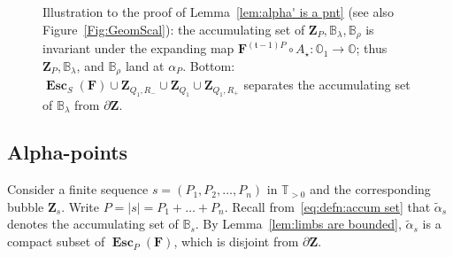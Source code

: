 \documentclass{amsart}
\newcommand{\1}{{\mathbb 1 }}
\newcommand\PT{\mathbb{ T}}
\newcommand{\bB}{{\mathbb{B}}}
\newcommand{\bO}{{\mathbb{O}}}
\newcommand{\bF}{{\mathbf F}}
\newcommand{\bZ}{{\mathbf Z}}
\newcommand{\str}{{\star}}
\renewcommand{\tt}{\mathfrak{t}}
\theoremstyle{remark}
\numberwithin{equation}{section}
\theoremstyle{definition}
\newcommand{\Esc}{{\boldsymbol{\operatorname{Esc}}}}
\theoremstyle{nonumberbreak}
\begin{document}
\begin{figure}[tp!]
 \caption{Illustration to the proof of Lemma~\ref{lem:alpha' is a pnt} (see also Figure~\ref{Fig:GeomScal}): the accumulating set of $\bZ_P, \bB_{\lambda}, \bB_{\rho}$ is invariant under the expanding map $\bF^{(\tt-1)P}\circ A_\str \colon \bO_1\to \bO$; thus $\bZ_P, \bB_{\lambda}$, and $\bB_{\rho}$  land at $\alpha_P$. Bottom: $\Esc_S(\bF)\cup \bZ_{Q_1,R_-}\cup \bZ_{Q_1}\cup \bZ_{Q_1,R_+}$ separates the accumulating set of $\bB_\lambda$ from $\partial \bZ$.
   }
 \label{Fig:B B Z land together}
\end{figure}



\subsection{Alpha-points}
\label{ss:alpha-points}
Consider a finite sequence $s=(P_1, P_2,\dots ,P_n)$ in $\PT_{>0}$ and the corresponding bubble $\bZ_s$. Write $P=|s|=P_1+\dots +P_n$.
Recall from~\eqref{eq:defn:accum set} that $\widetilde \alpha_s$ denotes the accumulating set of $\bB_s$.
By Lemma~\ref{lem:limbs are bounded}, $\widetilde \alpha_s$ is a compact subset of $\Esc_P(\bF)$, which is disjoint from $\partial \bZ$.
\end{document}
